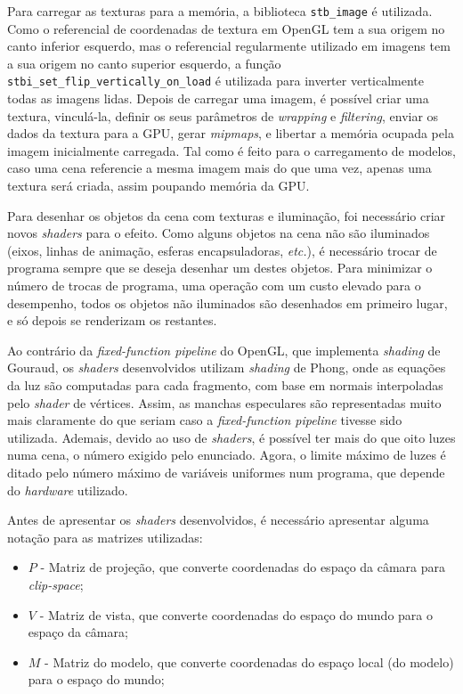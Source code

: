 \documentclass[12pt, a4paper]{article}
\begin{document}
Para carregar as texturas para a memória, a biblioteca \texttt{stb\_image} \cite{stb-image} é
utilizada. Como o referencial de coordenadas de textura em OpenGL tem a sua origem no canto inferior
esquerdo, mas o referencial regularmente utilizado em imagens tem a sua origem no canto superior
esquerdo, a função \texttt{stbi\_set\_flip\_vertically\_on\_load} é utilizada para inverter
verticalmente todas as imagens lidas. Depois de carregar uma imagem, é possível criar uma textura,
vinculá-la, definir os seus parâmetros de \emph{wrapping} e \emph{filtering}, enviar os dados da
textura para a GPU, gerar \emph{mipmaps}, e libertar a memória ocupada pela imagem inicialmente
carregada. Tal como é feito para o carregamento de modelos, caso uma cena referencie a mesma imagem
mais do que uma vez, apenas uma textura será criada, assim poupando memória da GPU.

Para desenhar os objetos da cena com texturas e iluminação, foi necessário criar novos
\emph{shaders} para o efeito. Como alguns objetos na cena não são iluminados (eixos, linhas de
animação, esferas encapsuladoras, \emph{etc.}), é necessário trocar de programa sempre que se deseja
desenhar um destes objetos. Para minimizar o número de trocas de programa, uma operação com um custo
elevado para o desempenho, todos os objetos não iluminados são desenhados em primeiro lugar, e só
depois se renderizam os restantes.

Ao contrário da \emph{fixed-function pipeline} do OpenGL, que implementa \emph{shading} de Gouraud,
os \emph{shaders} desenvolvidos utilizam \emph{shading} de Phong, onde as equações da luz são
computadas para cada fragmento, com base em normais interpoladas pelo \emph{shader} de vértices.
Assim, as manchas especulares são representadas muito mais claramente do que seriam caso a
\emph{fixed-function pipeline} tivesse sido utilizada. Ademais, devido ao uso de \emph{shaders}, é
possível ter mais do que oito luzes numa cena, o número exigido pelo enunciado. Agora, o limite
máximo de luzes é ditado pelo número máximo de variáveis uniformes num programa, que depende do
\emph{hardware} utilizado.

Antes de apresentar os \emph{shaders} desenvolvidos, é necessário apresentar alguma notação para as
matrizes utilizadas:

\begin{itemize}
    \item $P$ - Matriz de projeção, que converte coordenadas do espaço da câmara para
        \emph{clip-space};
    \item $V$ - Matriz de vista, que converte coordenadas do espaço do mundo para o espaço da
        câmara;
    \item $M$ - Matriz do modelo, que converte coordenadas do espaço local (do modelo) para o espaço
        do mundo;
\end{itemize}
\end{document}

